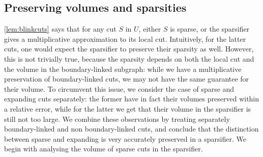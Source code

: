 \subsection{Preserving volumes and sparsities}
\label{subsec:preservingcuts}
 \cref{lem:blinkcuts} says that for any cut $S$ in $U$, either $S$ is sparse, or the sparsifier gives a multiplicative approximation to its local cut. Intuitively, for the latter cuts, one would expect the sparsifier to preserve their sparsity as well. However, this is not trivially true, because the sparsity depends on both the local cut and the volume in the boundary-linked subgraph: while we have a multiplicative preservation of boundary-linked cuts, we may not have the same guarantee for their volume. To circumvent this issue, we consider the case of sparse and expanding cuts separately: the former have in fact their volumes preserved within a relative error, while for the latter we get that their volume in the sparsifier is still not too large. We combine these observations by treating separately boundary-linked and non boundary-linked cuts, and conclude that the distinction between sparse and expanding is very accurately preserved in a sparsifier. We begin with analysing the volume of sparse cuts in the sparsifier.

